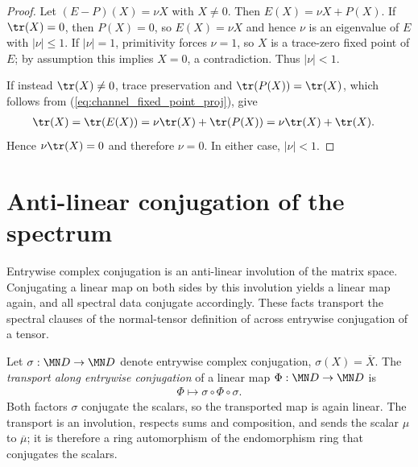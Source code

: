 \begin{proof}
    \leanok
    Let $(E-P)(X)=\nu X$ with $X\neq0$. Then
    $E(X)=\nu X+P(X)$. If $\tr(X)=0$, then $P(X)=0$, so
    $E(X)=\nu X$ and hence $\nu$ is an eigenvalue of $E$ with
    $|\nu|\le1$. If $|\nu|=1$, primitivity forces $\nu=1$, so $X$ is a
    trace-zero fixed point of $E$; by assumption this implies $X=0$, a
    contradiction. Thus $|\nu|<1$.

    If instead $\tr(X)\neq0$, trace preservation and
    $\tr(P(X))=\tr(X)$, which follows from
    (\ref{eq:channel_fixed_point_proj}), give
    \begin{align}
        \tr(X)
         & =\tr(E(X))
        =\nu\tr(X)+\tr(P(X))
        =\nu\tr(X)+\tr(X).
        \notag
    \end{align}
    Hence $\nu\tr(X)=0$ and therefore $\nu=0$. In either case,
    $|\nu|<1$.
\end{proof}

\section{Anti-linear conjugation of the spectrum}

Entrywise complex conjugation is an anti-linear involution of the matrix
space. Conjugating a linear map on both sides by this involution yields a
linear map again, and all spectral data conjugate accordingly. These facts
transport the spectral clauses of the normal-tensor definition of
\cite{Cirac2016MPDO_arXiv} across entrywise conjugation of a tensor.

\begin{definition}%
    \label{def:entrywise_conj_transport}
    \leanok
    Let $\sigma:\MN D\to\MN D$ denote entrywise complex conjugation,
    $\sigma(X)=\overline X$. The \emph{transport along entrywise conjugation}
    of a linear map $\Phi:\MN D\to\MN D$ is
    \begin{align}
        \Phi\longmapsto\sigma\circ\Phi\circ\sigma.
        \label{eq:entrywise_conj_transport}
    \end{align}
    Both factors $\sigma$ conjugate the scalars, so the transported map is
    again linear. The transport is an involution, respects sums and
    composition, and sends the scalar $\mu$ to $\overline\mu$; it is therefore
    a ring automorphism of the endomorphism ring that conjugates the scalars.
\end{definition}

